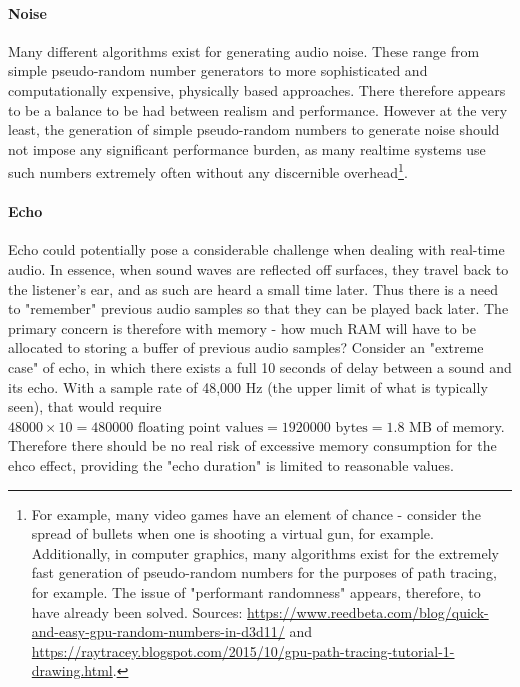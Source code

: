 \paragraph{Noise} Many different algorithms exist for generating audio noise. These range from simple pseudo-random number generators to more sophisticated and computationally expensive, physically based approaches. There therefore appears to be a balance to be had between realism and performance. However at the very least, the generation of simple pseudo-random numbers to generate noise should not impose any significant performance burden, as many realtime systems use such numbers extremely often without any discernible overhead\footnote{
	For example, many video games have an element of chance - consider the spread of bullets when one is shooting a virtual gun, for example. Additionally, in computer graphics, many algorithms exist for the extremely fast generation of pseudo-random numbers for the purposes of path tracing, for example. The issue of "performant randomness" appears, therefore, to have already been solved.  Sources: \href{https://www.reedbeta.com/blog/quick-and-easy-gpu-random-numbers-in-d3d11/}{https://www.reedbeta.com/blog/quick-and-easy-gpu-random-numbers-in-d3d11/} and \href{https://raytracey.blogspot.com/2015/10/gpu-path-tracing-tutorial-1-drawing.html}{https://raytracey.blogspot.com/2015/10/gpu-path-tracing-tutorial-1-drawing.html}.
}.

\paragraph{Echo} Echo could potentially pose a considerable challenge when dealing with real-time audio. In essence, when sound waves are reflected off surfaces, they travel back to the listener's ear, and as such are heard a small time later. Thus there is a need to "remember" previous audio samples so that they can be played back later. The primary concern is therefore with memory - how much RAM will have to be allocated to storing a buffer of previous audio samples? Consider an "extreme case" of echo, in which there exists a full 10 seconds of delay between a sound and its echo. With a sample rate of 48,000 Hz (the upper limit of what is typically seen), that would require \(48000 \times 10 = 480000 \text{ floating point values} = 1920000 \text{ bytes} = 1.8 \text{ MB}\) of memory. Therefore there should be no real risk of excessive memory consumption for the ehco effect, providing the "echo duration" is limited to reasonable values.

